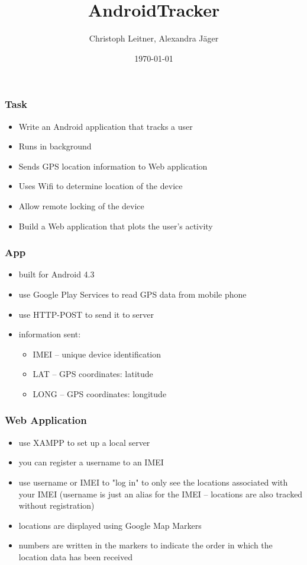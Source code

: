 \documentclass[darktitle]{beamer}
\title{AndroidTracker}
\author{Christoph Leitner, Alexandra J\"ager}
\date{\today}
\begin{document}
	\begin{frame}
		\titlepage
	\end{frame}

	\begin{frame}
		\frametitle{Task}
		\begin{itemize}
			\item Write an Android application that tracks a user
			\item Runs in background
			\item Sends GPS location information to Web application
			\item Uses Wifi to determine location of the device
			\item Allow remote locking of the device
			\item Build a Web application that plots the user's activity
		\end{itemize}
	\end{frame}

	\begin{frame}
		\frametitle{App}
		\begin{itemize}
			\item built for Android 4.3
			\item use Google Play Services to read GPS data from mobile phone
			\item use HTTP-POST to send it to server
			\item information sent:
				\begin{itemize}
					\item IMEI -- unique device identification
					\item LAT -- GPS coordinates: latitude
					\item LONG -- GPS coordinates: longitude
				\end{itemize}
		\end{itemize}
		
	\end{frame}

	\begin{frame}
		\frametitle{Web Application}
		\begin{itemize}
			\item use XAMPP to set up a local server
			\item you can register a username to an IMEI
			\item use username or IMEI to "log in" to only see the locations associated with your IMEI  (username is just an alias for the IMEI -- locations are also tracked without registration)
			\item locations are displayed using Google Map Markers
			\item numbers are written in the markers to indicate the order in which the location data has been received
		\end{itemize}
	\end{frame}
\end{document}
